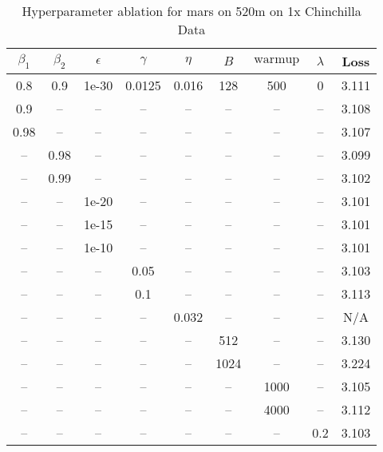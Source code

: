 \begin{table}[h!]
\centering
\caption{Hyperparameter ablation for mars on 520m on 1x Chinchilla Data}
\label{tab:ablation_mars_520m_on_1x_chinchilla_data}
\begin{tabular}{ccccccccc}
\toprule
$\beta_1$ & $\beta_2$ & $\epsilon$ & $\gamma$ & $\eta$ & $B$ & $\mathrm{warmup}$ & $\lambda$ & Loss \\
\midrule
0.8 & 0.9 & 1e-30 & 0.0125 & 0.016 & 128 & 500 & 0 & 3.111 \\
\midrule
0.9 & -- & -- & -- & -- & -- & -- & -- & 3.108 \\
0.98 & -- & -- & -- & -- & -- & -- & -- & 3.107 \\
-- & 0.98 & -- & -- & -- & -- & -- & -- & 3.099 \\
-- & 0.99 & -- & -- & -- & -- & -- & -- & 3.102 \\
-- & -- & 1e-20 & -- & -- & -- & -- & -- & 3.101 \\
-- & -- & 1e-15 & -- & -- & -- & -- & -- & 3.101 \\
-- & -- & 1e-10 & -- & -- & -- & -- & -- & 3.101 \\
-- & -- & -- & 0.05 & -- & -- & -- & -- & 3.103 \\
-- & -- & -- & 0.1 & -- & -- & -- & -- & 3.113 \\
-- & -- & -- & -- & 0.032 & -- & -- & -- & N/A \\
-- & -- & -- & -- & -- & 512 & -- & -- & 3.130 \\
-- & -- & -- & -- & -- & 1024 & -- & -- & 3.224 \\
-- & -- & -- & -- & -- & -- & 1000 & -- & 3.105 \\
-- & -- & -- & -- & -- & -- & 4000 & -- & 3.112 \\
-- & -- & -- & -- & -- & -- & -- & 0.2 & 3.103 \\
\bottomrule
\end{tabular}
\end{table}

